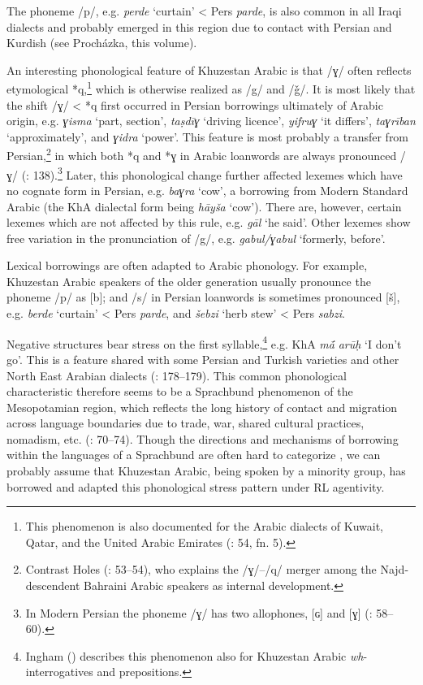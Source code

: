 \documentclass[output=paper,nonflat]{langsci/langscibook}
\begin{document}
The phoneme /p/, e.g. \textit{perde} ‘curtain’ < Pers \textit{parde}, is also common in all Iraqi dialects and probably emerged in this region due to contact with Persian and Kurdish (see Procházka, this volume). 

An interesting phonological feature of Khuzestan Arabic is that /ɣ/ often reflects etymological *q,\footnote{This phenomenon is also documented for the Arabic dialects of Kuwait, Qatar, and the United Arabic Emirates (\citealt{Holes2016}: 54, fn. 5).} which is otherwise realized as /g/ and /ǧ/. It is most likely that the shift /ɣ/ < *q first occurred in Persian borrowings ultimately of Arabic origin, e.g. \textit{ɣisma} ‘part, section’, \textit{taṣdīɣ} ‘driving licence’, \textit{yifruɣ} ‘it differs’, \textit{taɣrīban} ‘approximately’, and \textit{ɣidra} ‘power’. This feature is most probably a transfer from Persian,\footnote{Contrast Holes (\citeyear{Holes2016}: 53–54), who explains the /ɣ/–/q/ merger among the Najd-descendent Bahraini Arabic speakers as internal development.} in which both *q and *ɣ in Arabic loanwords are always pronounced /ɣ/ (\citealt{MatrasShabibi2007}: 138).\footnote{In Modern Persian the phoneme /ɣ/ has two allophones, [ɢ] and [ɣ] (\citealt{Majidi1986}: 58–60).} Later, this phonological change further affected lexemes which have no cognate form in Persian, e.g. \textit{baɣra} `cow', a borrowing from Modern Standard Arabic (the KhA dialectal form being \textit{hāyša} `cow'). There are, however, certain lexemes which are not affected by this rule, e.g. \textit{gāl} `he said'. Other lexemes show free variation in the pronunciation of /g/, e.g. \textit{gabul/ɣabul} `formerly, before'.

Lexical borrowings are often adapted to Arabic phonology. For example, Khuzestan Arabic speakers of the older generation usually pronounce the phoneme /p/ as [b]; and /s/ in Persian loanwords is sometimes pronounced [š], e.g. \textit{berde} ‘curtain’ < Pers \textit{parde}, and \textit{šebzi} ‘herb stew’ < Pers \textit{sabzi}. 

Negative structures bear stress on the first syllable,\footnote{Ingham (\citeyear[724]{Ingham1991}) describes this phenomenon also for Khuzestan Arabic \textit{wh}-interrogatives and prepositions.} e.g. KhA \textit{mā́} \textit{arūḥ} ‘I don’t go’. This is a feature shared with some Persian and Turkish varieties and other North East Arabian dialects (\citealt{Ingham2005}: 178–179). This common phonological characteristic therefore seems to be a Sprachbund phenomenon of the Mesopotamian region, which reflects the long history of contact and migration across language boundaries due to trade, war, shared cultural practices, nomadism, etc. (\citealt{Winford2003}: 70–74). Though the directions and mechanisms of borrowing within the languages of a Sprachbund are often hard to categorize \citep[74]{Winford2003}, we can probably assume that Khuzestan Arabic, being spoken by a minority group, has borrowed and adapted this phonological stress pattern under RL agentivity.
\end{document}
